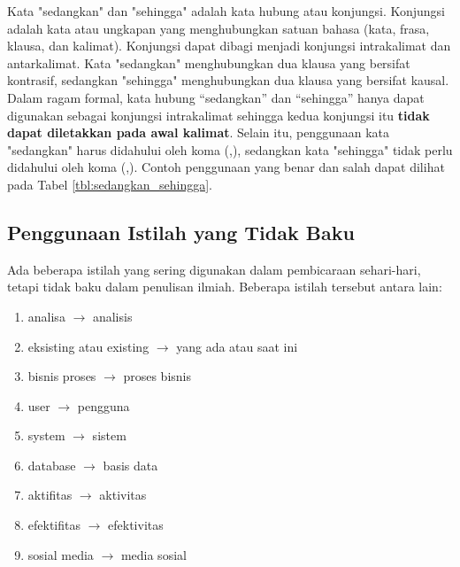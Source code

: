 \documentclass[12pt,a4paper,oneside]{book}
\begin{document}
Kata "sedangkan" dan "sehingga" adalah kata hubung atau konjungsi. 
Konjungsi adalah kata atau ungkapan yang menghubungkan satuan bahasa 
(kata, frasa, klausa, dan kalimat). 
Konjungsi dapat dibagi menjadi konjungsi intrakalimat dan antarkalimat.  
Kata "sedangkan" menghubungkan dua klausa yang bersifat kontrasif, 
sedangkan "sehingga" menghubungkan dua klausa yang bersifat kausal. 
Dalam ragam formal, kata hubung “sedangkan” dan “sehingga” hanya dapat digunakan 
sebagai konjungsi intrakalimat sehingga kedua konjungsi itu \textbf{tidak dapat diletakkan pada awal kalimat}.
Selain itu, penggunaan kata "sedangkan" harus didahului oleh koma (,), sedangkan kata "sehingga" tidak perlu didahului oleh koma (,).
Contoh penggunaan yang benar dan salah dapat dilihat pada Tabel \ref{tbl:sedangkan_sehingga}.


\subsection{Penggunaan Istilah yang Tidak Baku}
Ada beberapa istilah yang sering digunakan dalam pembicaraan sehari-hari, tetapi tidak baku dalam penulisan ilmiah.
Beberapa istilah tersebut antara lain:
\begin{enumerate}
  \item analisa $\rightarrow$ analisis
  \item eksisting atau existing $\rightarrow$ yang ada atau saat ini
  \item bisnis proses $\rightarrow$ proses bisnis
  \item user $\rightarrow$ pengguna
  \item system $\rightarrow$ sistem
  \item database $\rightarrow$ basis data
  \item aktifitas $\rightarrow$ aktivitas
  \item efektifitas $\rightarrow$ efektivitas
  \item sosial media $\rightarrow$ media sosial
\end{enumerate}




\end{document}
